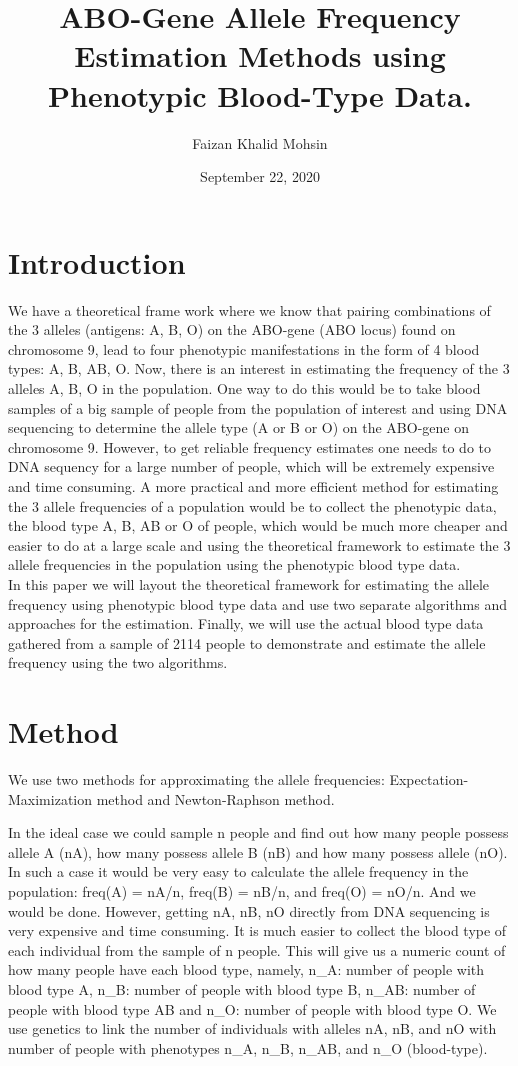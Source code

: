 \documentclass[]{article}
\title{ABO-Gene Allele Frequency Estimation Methods using Phenotypic Blood-Type
Data.}
\author{Faizan Khalid Mohsin}
\date{September 22, 2020}
\begin{document}
\maketitle

\section{Introduction}\label{introduction}

We have a theoretical frame work where we know that pairing combinations
of the 3 alleles (antigens: A, B, O) on the ABO-gene (ABO locus) found
on chromosome 9, lead to four phenotypic manifestations in the form of 4
blood types: A, B, AB, O. Now, there is an interest in estimating the
frequency of the 3 alleles A, B, O in the population. One way to do this
would be to take blood samples of a big sample of people from the
population of interest and using DNA sequencing to determine the allele
type (A or B or O) on the ABO-gene on chromosome 9. However, to get
reliable frequency estimates one needs to do to DNA sequency for a large
number of people, which will be extremely expensive and time consuming.
A more practical and more efficient method for estimating the 3 allele
frequencies of a population would be to collect the phenotypic data, the
blood type A, B, AB or O of people, which would be much more cheaper and
easier to do at a large scale and using the theoretical framework to
estimate the 3 allele frequencies in the population using the phenotypic
blood type data.\\
In this paper we will layout the theoretical framework for estimating
the allele frequency using phenotypic blood type data and use two
separate algorithms and approaches for the estimation. Finally, we will
use the actual blood type data gathered from a sample of 2114 people to
demonstrate and estimate the allele frequency using the two algorithms.

\section{Method}\label{method}

We use two methods for approximating the allele frequencies:
Expectation-Maximization method and Newton-Raphson method.

In the ideal case we could sample n people and find out how many people
possess allele A (nA), how many possess allele B (nB) and how many
possess allele (nO). In such a case it would be very easy to calculate
the allele frequency in the population: freq(A) = nA/n, freq(B) = nB/n,
and freq(O) = nO/n. And we would be done. However, getting nA, nB, nO
directly from DNA sequencing is very expensive and time consuming. It is
much easier to collect the blood type of each individual from the sample
of n people. This will give us a numeric count of how many people have
each blood type, namely, n\_A: number of people with blood type A, n\_B:
number of people with blood type B, n\_AB: number of people with blood
type AB and n\_O: number of people with blood type O. We use genetics to
link the number of individuals with alleles nA, nB, and nO with number
of people with phenotypes n\_A, n\_B, n\_AB, and n\_O (blood-type).
\end{document}

